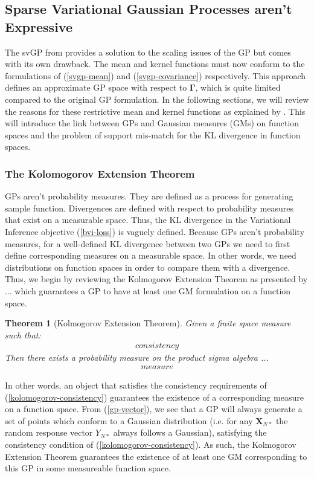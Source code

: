 \documentclass{article}
\newtheorem{theorem}{Theorem}
\numberwithin{equation}{section}
\begin{document}
\subsection{Sparse Variational Gaussian Processes aren't Expressive}\label{section:svgp-problems}
The svGP from \cite{titsias2009variational} provides a solution to the scaling issues of the GP but comes with its own drawback. The mean and kernel functions must now conform to the formulations of (\ref{svgp-mean}) and (\ref{svgp-covariance}) respectively. This approach defines an approximate GP space with respect to $\mathbf{\Gamma}$, which is quite limited compared to the original GP formulation. In the following sections, we will review the reasons for these restrictive mean and kernel functions as explained by \cite{matthews2017scalable}. This will introduce the link between GPs and Gaussian measures (GMs) on function spaces and the problem of support mis-match for the KL divergence in function spaces.

\subsubsection{The Kolomogorov Extension Theorem}
GPs aren't probability measures. They are defined as a process for generating sample function. Divergences are defined with respect to probability measures that exist on a measurable space. Thus, the KL divergence in the Variational Inference objective (\ref{bvi-loss}) is vaguely defined.  Because GPs aren't probability measures, for a well-defined KL divergence between two GPs we need to first define corresponding measures on a measurable space. In other words, we need distributions on function spaces in order to compare them with a divergence.
Thus, we begin by reviewing the Kolmogorov Extension Theorem as presented by ... which guarantees a GP to have at least one GM formulation on a function space.
\begin{theorem}[Kolmogorov Extension Theorem]
\label{kolomogorov-extension-theorem}
Given a finite space measure such that:
\begin{align}
    consistency
    \label{kolomogorov-consistency}
\end{align}
Then there exists a probability measure on the product sigma algebra ...
\begin{align}
    measure
    \label{kolomogorov-measure}
\end{align}
\end{theorem}
In other words, an object that satisfies the consistency requirements of (\ref{kolomogorov-consistency}) guarantees the existence of a corresponding measure on a function space. From (\ref{gp-vector}), we see that a GP will always generate a set of points which conform to a Gaussian distribution (i.e. for any $\mathbf{X}_{N*}$ the random response vector $Y_{N*}$ always follows a Gaussian), satisfying the consistency condition of (\ref{kolomogorov-consistency}). As such, the Kolmogorov Extension Theorem guarantees the existence of at least one GM corresponding to this GP in some measureable function space.
\end{document}
